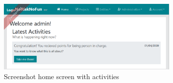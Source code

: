 \begin{figure}[H]
	\centering
	\includegraphics[width=0.8\textwidth]{Assets/implementation_shots/activitystream.png}
	\caption{Screenshot home screen with activities}
	\label{fig:activitystream}
\end{figure}